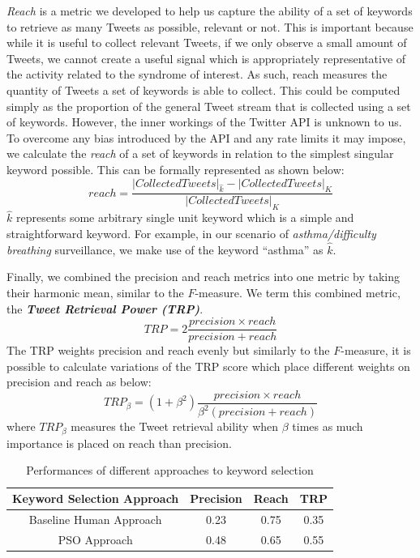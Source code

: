 \documentclass[runningheads]{llncs}
\begin{document}
\textit{Reach} is a metric we developed to help us capture the ability of a set of keywords to retrieve as many Tweets as possible, relevant or not. This is important because while it is useful to collect relevant Tweets, if we only observe a small amount of Tweets, we cannot create a useful signal which is appropriately representative of the activity related to the syndrome of interest. As such, reach measures the quantity of Tweets a set of keywords is able to collect. This could be computed simply as the proportion of the general Tweet stream that is collected using a set of keywords. However, the inner workings of the Twitter API is unknown to us. To overcome any bias introduced by the API and any rate limits it may impose, we calculate the \textit{reach} of a set of keywords in relation to the simplest singular keyword possible. This can be formally represented as shown below:
\begin{equation}
	reach = \frac{|Collected Tweets|_{\hat{k}} - |Collected Tweets|_{K}}{|Collected Tweets|_{K}}
\end{equation}
$\hat{k}$ represents some arbitrary single unit keyword which is a simple and straightforward keyword. For example, in our scenario of \textit{asthma/difficulty breathing} surveillance, we make use of the keyword ``asthma'' as $\hat{k}$.

Finally, we combined the precision and reach metrics into one metric by taking their harmonic mean, similar to the $F$-measure. We term this combined metric, the \textit{\textbf{Tweet Retrieval Power (TRP)}}.
\begin{equation}
	TRP = 2 \frac{precision \times reach}{precision + reach}
\end{equation}
The TRP weights precision and reach evenly but similarly to the $F$-measure, it is possible to calculate variations of the TRP score which place different weights on precision and reach as below:
\begin{equation}
	TRP_\beta = (1 + \beta^2) \frac{precision \times reach}{\beta^2(precision + reach)}
\end{equation}
where $TRP_\beta$ measures the Tweet retrieval ability when $\beta$ times as much importance is placed on reach than precision.


\begin{table}
	\centering
	\begin{tabular}{ |c|c|c|c| } 
		\hline
		\textbf{Keyword Selection Approach} & \textbf{Precision} & \textbf{Reach} & \textbf{TRP} \\
		\hline
		Baseline Human Approach  & 0.23 & 0.75 & 0.35\\
		\hline
		PSO Approach  & 0.48 & 0.65 & 0.55 \\
		\hline
	\end{tabular}
	\caption{Performances of different approaches to keyword selection}
	\label{table:kw-analysis}
\end{table}
\end{document}
